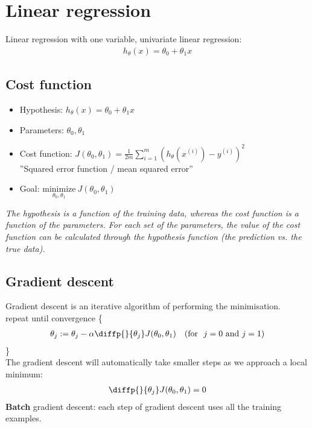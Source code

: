 \section{Linear regression}
\label{sec:Linearregression}
Linear regression with one variable, univariate linear regression:
\begin{align} %
   h_\theta(x) = \theta_0 + \theta_1 x
\end{align}

%
\subsection{Cost function}
\begin{itemize}
\item Hypothesis: $h_\theta(x) = \theta_0 + \theta_1 x$
\item Parameters: $\theta_0, \theta_1$
\item Cost function: $J(\theta_0, \theta_1) = \frac{1}{2m}\sum_{i=1}^{m}(h_\theta(x^{(i)})-y^(i))^2$ \\
	''Squared error function / mean squared error''
\item Goal: $\underset{\theta_0 , \theta_1}{\text{minimize}} \ J(\theta_0, \theta_1)$
\end{itemize}

\emph{\textcolor{Bittersweet}{The hypothesis is a function of the training data, whereas the cost function is a function of the parameters. For each set of the parameters, the value of the cost function can be calculated through the hypothesis function (the prediction vs. the true data).}}

%
\subsection{Gradient descent}
Gradient descent is an iterative algorithm of performing the minimisation.\\
repeat until convergence \{ \\
\begin{align} %
\theta_j := \theta_j - \alpha \diffp{ }{{\theta_j}} J(\theta_0, \theta_1) \quad \text{(for \ $j=0$ and $j=1$)}
\end{align}
\} \\
The gradient descent will automatically take smaller steps as we approach a local minimum:
\begin{align} %
\diffp{ }{{\theta_j}} J(\theta_0, \theta_1) = 0
\end{align}
\textbf{Batch} gradient descent: each step of gradient descent uses all the training examples.

